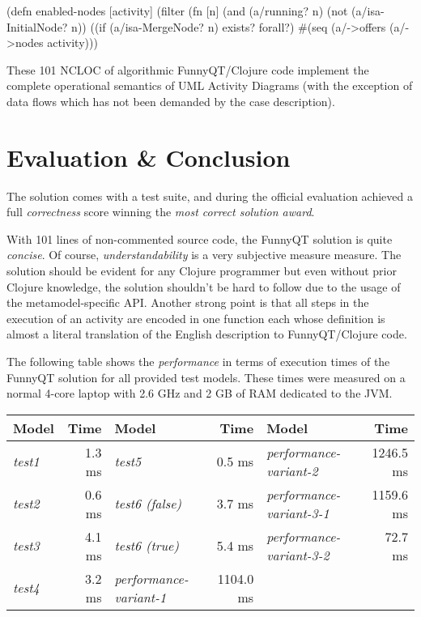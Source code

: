 \documentclass[submission]{eptcs}
\begin{document}
\begin{clojurecode}
(defn enabled-nodes [activity]
  (filter (fn [n]
            (and (a/running? n)
                 (not (a/isa-InitialNode? n))
                 ((if (a/isa-MergeNode? n) exists? forall?)
                  #(seq (a/->offers %
          (a/->nodes activity)))
\end{clojurecode}

These 101 NCLOC of algorithmic FunnyQT/Clojure code implement the complete
operational semantics of UML Activity Diagrams (with the exception of data
flows which has not been demanded by the case description).

\section{Evaluation \& Conclusion}
\label{sec:evaluation}

The solution comes with a test suite, and during the official evaluation
achieved a full \emph{correctness} score winning the \emph{most correct
  solution award}.

With 101 lines of non-commented source code, the FunnyQT solution is quite
\emph{concise}.  Of course, \emph{understandability} is a very subjective
measure measure.  The solution should be evident for any Clojure programmer but
even without prior Clojure knowledge, the solution shouldn't be hard to follow
due to the usage of the metamodel-specific API.  Another strong point is that
all steps in the execution of an activity are encoded in one function each
whose definition is almost a literal translation of the English description to
FunnyQT/Clojure code.

The following table shows the \emph{performance} in terms of execution times of
the FunnyQT solution for all provided test models.  These times were measured
on a normal 4-core laptop with 2.6 GHz and 2 GB of RAM dedicated to the JVM.

\vspace{3pt}
\begin{tabular}{|l r | l r | l r |}
  \hline
  \textbf{Model} & \textbf{Time} & \textbf{Model} & \textbf{Time} & \textbf{Model} & \textbf{Time}\\
  \hline
  \emph{test1} & 1.3 ms & \emph{test5} & 0.5 ms & \emph{performance-variant-2} & 1246.5 ms\\
  \emph{test2} & 0.6 ms & \emph{test6 (false)} & 3.7 ms & \emph{performance-variant-3-1} & 1159.6 ms\\
  \emph{test3} & 4.1 ms & \emph{test6 (true)}  & 5.4 ms & \emph{performance-variant-3-2} & 72.7 ms\\
  \emph{test4} & 3.2 ms & \emph{performance-variant-1} & 1104.0 ms & &\\
  \hline
\end{tabular}
\vspace{3pt}
\end{document}
